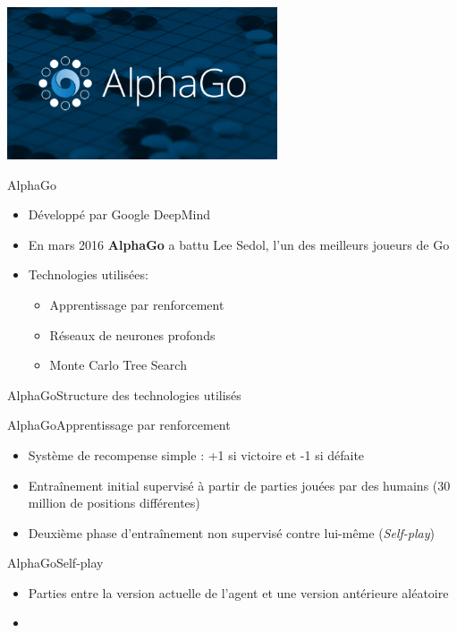 \begin{frame}
	\begin{center}
		\includegraphics[width=8cm]{ressources/AlphaGoLogo}

	\end{center}
\end{frame}


\begin{frame}{AlphaGo}
	\begin{itemize}
		\item Développé par Google DeepMind
		\item En mars 2016 \textbf{AlphaGo} a battu Lee Sedol, l'un des meilleurs joueurs de Go
		\item Technologies utilisées:
		      \begin{itemize}
			      \item Apprentissage par renforcement
			      \item Réseaux de neurones profonds
			      \item Monte Carlo Tree Search
		      \end{itemize}
	\end{itemize}
\end{frame}


\begin{frame}{AlphaGo}{Structure des technologies utilisés}


\end{frame}
\begin{frame}{AlphaGo}{Apprentissage par renforcement}

	\begin{itemize}
		\item Système de recompense simple : +1 si victoire et -1 si défaite
		\item Entraînement initial supervisé à partir de parties jouées par des humains (30 million de positions différentes)
		\item Deuxième phase d'entraînement non supervisé contre lui-même (\textit{Self-play})
	\end{itemize}

\end{frame}


\begin{frame}{AlphaGo}{Self-play}

	\begin{itemize}
		\item Parties entre la version actuelle de l'agent et une version antérieure aléatoire
		\item
	\end{itemize}

\end{frame}

